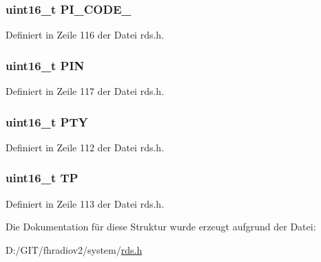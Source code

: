 \subsubsection[{P\+I\+\_\+\+C\+O\+D\+E\+\_\+2}]{\setlength{\rightskip}{0pt plus 5cm}uint16\+\_\+t P\+I\+\_\+\+C\+O\+D\+E\+\_}\label{structgroup__1b_ae86fed9d07832a5c3cc36d5aaa064bcb}


Definiert in Zeile 116 der Datei rds.\+h.

\hypertarget{structgroup__1b_a23b9db30b873d9b45f435df66328a784}{}
\subsubsection[{P\+I\+N}]{\setlength{\rightskip}{0pt plus 5cm}uint16\+\_\+t P\+I\+N}\label{structgroup__1b_a23b9db30b873d9b45f435df66328a784}


Definiert in Zeile 117 der Datei rds.\+h.

\hypertarget{structgroup__1b_a0474967478fbbc2c71b800d2e0132d45}{}
\subsubsection[{P\+T\+Y}]{\setlength{\rightskip}{0pt plus 5cm}uint16\+\_\+t P\+T\+Y}\label{structgroup__1b_a0474967478fbbc2c71b800d2e0132d45}


Definiert in Zeile 112 der Datei rds.\+h.

\hypertarget{structgroup__1b_ab9e634c63b0d95a96716d5f6d7f06d72}{}
\subsubsection[{T\+P}]{\setlength{\rightskip}{0pt plus 5cm}uint16\+\_\+t T\+P}\label{structgroup__1b_ab9e634c63b0d95a96716d5f6d7f06d72}


Definiert in Zeile 113 der Datei rds.\+h.



Die Dokumentation für diese Struktur wurde erzeugt aufgrund der Datei\+:\begin{DoxyCompactItemize}
\item 
D\+:/\+G\+I\+T/fhradiov2/system/\hyperlink{rds_8h}{rds.\+h}\end{DoxyCompactItemize}
